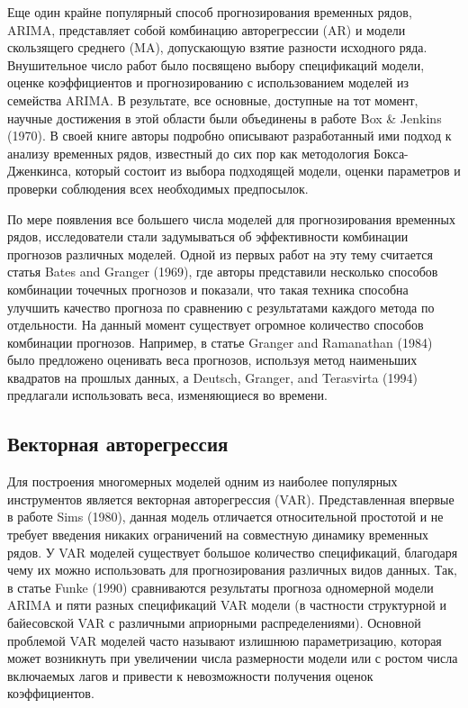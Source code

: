Еще один крайне популярный способ прогнозирования временных рядов, ARIMA, представляет собой комбинацию авторегрессии (AR) и модели скользящего среднего (MA), допускающую взятие разности исходного ряда.  Внушительное число работ было посвящено выбору спецификаций модели, оценке коэффициентов и прогнозированию с использованием моделей из семейства ARIMA.  В результате, все основные, доступные на тот момент, научные достижения в этой области были объединены в работе Box \& Jenkins (1970).  В своей книге авторы подробно описывают разработанный ими подход к анализу временных рядов, известный до сих пор как методология Бокса-Дженкинса, который состоит из выбора подходящей модели, оценки параметров и проверки соблюдения всех необходимых предпосылок.

По мере появления все большего числа моделей для прогнозирования временных рядов, исследователи стали задумываться об эффективности комбинации прогнозов различных моделей. Одной из первых работ на эту тему считается статья 	Bates and Granger (1969), где авторы представили несколько способов комбинации точечных прогнозов и показали, что такая техника способна улучшить качество прогноза по сравнению с результатами каждого метода по отдельности. На данный момент существует огромное количество способов комбинации прогнозов. Например, в статье Granger and Ramanathan (1984) было предложено оценивать веса прогнозов, используя метод наименьших квадратов на прошлых данных, а Deutsch, Granger, and Terasvirta (1994) предлагали использовать веса, изменяющиеся во времени.

\subsection{Векторная авторегрессия}
Для построения многомерных моделей одним из наиболее популярных инструментов является векторная авторегрессия (VAR). Представленная впервые в работе Sims (1980), данная модель отличается относительной простотой и не требует введения никаких ограничений на совместную динамику временных рядов. У VAR моделей существует большое количество спецификаций, благодаря чему их можно использовать для прогнозирования различных видов данных. Так, в статье Funke (1990) сравниваются результаты прогноза одномерной модели ARIMA и пяти разных спецификаций VAR модели (в частности структурной и байесовской VAR с различными априорными распределениями). Основной проблемой VAR моделей часто называют излишнюю параметризацию, которая может возникнуть при увеличении числа размерности модели или с ростом числа включаемых лагов и привести к невозможности получения оценок коэффициентов.

